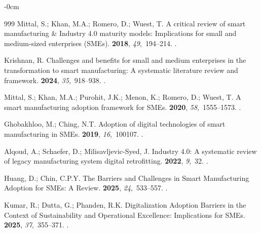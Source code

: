 \documentclass[systems,article,accept,pdftex,moreauthors]{Definitions/mdpi}
\begin{document}
\begin{adjustwidth}{-\extralength}{0cm}
\begin{thebibliography}{999}
Mittal, S.; Khan, M.A.; Romero, D.; Wuest, T.
\newblock A critical review of smart manufacturing \& Industry 4.0 maturity
  models: Implications for small and medium-sized enterprises (SMEs).
 {\bf 2018}, {\em 49},~194--214.
.

Krishnan, R.
\newblock Challenges and benefits for small and medium enterprises in the
  transformation to smart manufacturing: A systematic literature review and
  framework.
 {\bf 2024}, {\em 35},~918--938.
.

Mittal, S.; Khan, M.A.; Purohit, J.K.; Menon, K.; Romero, D.; Wuest, T.
\newblock A smart manufacturing adoption framework for SMEs.
 {\bf 2020}, {\em 58},~1555--1573.
.

Ghobakhloo, M.; Ching, N.T.
\newblock Adoption of digital technologies of smart manufacturing in SMEs.
 {\bf 2019}, {\em 16},~100107.
.

Alqoud, A.; Schaefer, D.; Milisavljevic-Syed, J.
\newblock Industry 4.0: A systematic review of legacy manufacturing system
  digital retrofitting.
 {\bf 2022}, {\em 9},~{32.} 
\newblock {}.%


Huang, D.; Chin, C.P.Y.
\newblock The Barriers and Challenges in Smart Manufacturing Adoption for SMEs:
  A Review.
 {\bf 2025}, {\em 24},~533--557.
.

Kumar, R.; Dutta, G.; Phanden, R.K.
\newblock Digitalization Adoption Barriers in the Context of Sustainability and
  Operational Excellence: Implications for SMEs.
 {\bf 2025}, {\em 37},~355--371.
.


\end{thebibliography}
\end{adjustwidth}
\end{document}
